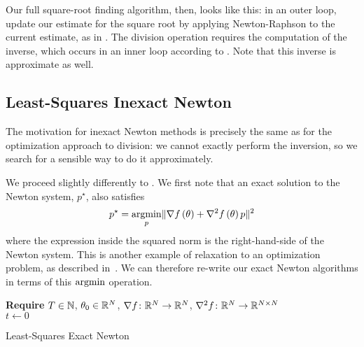 \documentclass[../../thesis.tex]{subfiles}
\begin{document}
Our full square-root finding algorithm, then,
looks like this:
in an outer loop,
update our estimate for the square root
by applying Newton-Raphson to
the current estimate,
as in .
The division operation requires the computation of the inverse,
which occurs in an inner loop
according to .
Note that this inverse is approximate as well.

\subsection{Least-Squares Inexact Newton}

The motivation for inexact Newton methods
is precisely the same as for the optimization approach to division:
we cannot exactly perform the inversion,
so we search for a sensible way to do it approximately.

We proceed slightly differently to .
We first note that an exact solution to the Newton system,
$p^\star$,
also satisfies
\begin{equation}\equationlabel{newton-ls}
	p^\star = \argmin_p \snorm{\grad{f}{\theta} + \hess{f}{\theta}p}
\end{equation}
\noindent where the expression inside the squared norm
is the right-hand-side of the Newton system.
This is another example of relaxation to an optimization problem,
as described in~.
We can therefore re-write our
exact Newton algorithms
in terms of this $\mathop{\mathrm{argmin}}$ operation.
\\
\begin{algorithm}[H]
    \SetAlgoLined{}
    \textbf{Require}
    $T\in \mathbb{N}$, $\theta_0 \in \mathbb{R}^N$,
    $\nabla{f}\colon\mathbb{R}^N\to\mathbb{R}^N$,
    $\nabla^2{f}\colon\mathbb{R}^N\to\mathbb{R}^{N\times N}$\\
    $t \leftarrow 0$\\
    \caption{Least-Squares Exact Newton}
\end{algorithm}
\end{document}
